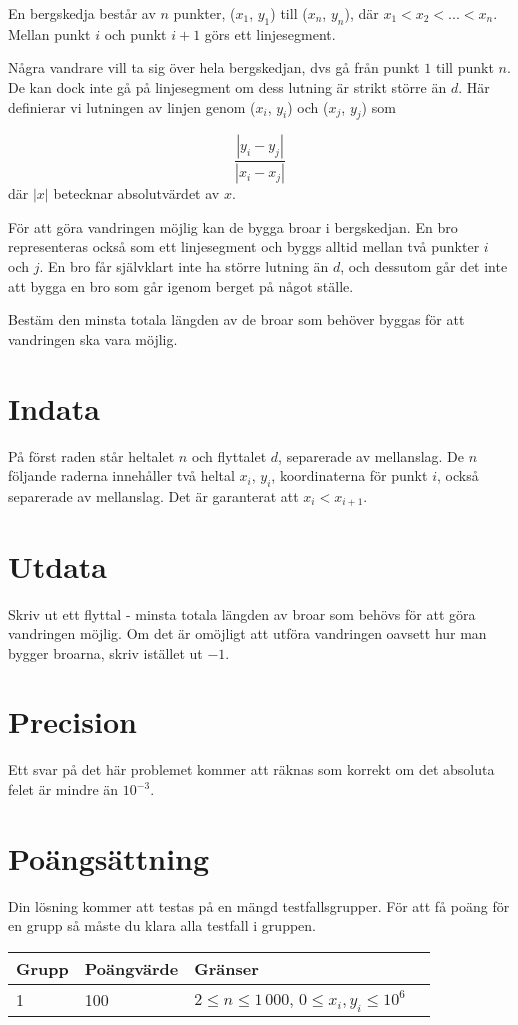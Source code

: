 En bergskedja består av $n$ punkter, ($x_1$, $y_1$) till ($x_n$, $y_n$), där $x_1 < x_2 < ... < x_n$. Mellan punkt $i$ och punkt $i+1$ görs ett linjesegment.

Några vandrare vill ta sig över hela bergskedjan, dvs gå från punkt $1$ till punkt $n$. De kan dock inte gå på linjesegment om dess lutning är strikt större än $d$. Här definierar vi lutningen av linjen genom ($x_i$, $y_i$) och ($x_j$, $y_j$) som

$$
\frac{|y_i - y_j|}{|x_i - x_j|}
$$
där $|x|$ betecknar absolutvärdet av $x$.

För att göra vandringen möjlig kan de bygga broar i bergskedjan. En bro representeras också som ett linjesegment och byggs alltid mellan två punkter $i$ och $j$. En bro får självklart inte ha större lutning än $d$, och dessutom går det inte att bygga en bro som går igenom berget på något ställe.

Bestäm den minsta totala längden av de broar som behöver byggas för att vandringen ska vara möjlig.

\section*{Indata}
På först raden står heltalet $n$ och flyttalet $d$, separerade av mellanslag.
De $n$ följande raderna innehåller två heltal $x_i$, $y_i$, koordinaterna för punkt $i$, också separerade av mellanslag. Det är garanterat att $x_i < x_{i+1}$.

\section*{Utdata}
Skriv ut ett flyttal - minsta totala längden av broar som behövs för att göra vandringen möjlig.
Om det är omöjligt att utföra vandringen oavsett hur man bygger broarna, skriv istället ut $-1$.

\section*{Precision}
Ett svar på det här problemet kommer att räknas som korrekt om det absoluta felet är mindre än $10^{-3}$.

\section*{Poängsättning}

Din lösning kommer att testas på en mängd testfallsgrupper. För att få poäng för en grupp
så måste du klara alla testfall i gruppen.

\begin{tabular}{| l | l | l | l |}
\hline
Grupp & Poängvärde & Gränser \\ \hline
1     & 100         & $ 2 \le n \le 1\,000$, $0 \le x_i, y_i \le 10^6$ \\ \hline
\end{tabular}
